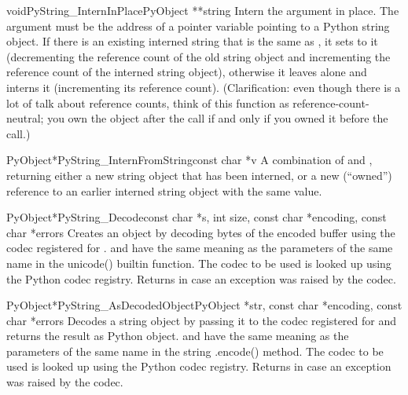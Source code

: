 \documentclass{manual}
\begin{document}
\begin{cfuncdesc}{void}{PyString_InternInPlace}{PyObject **string}
Intern the argument  in place.  The argument must be the
address of a pointer variable pointing to a Python string object.
If there is an existing interned string that is the same as
, it sets  to it (decrementing the reference 
count of the old string object and incrementing the reference count of
the interned string object), otherwise it leaves  alone
and interns it (incrementing its reference count).  (Clarification:
even though there is a lot of talk about reference counts, think of
this function as reference-count-neutral; you own the object after
the call if and only if you owned it before the call.)
\end{cfuncdesc}

\begin{cfuncdesc}{PyObject*}{PyString_InternFromString}{const char *v}
A combination of  and
, returning either a new string object
that has been interned, or a new (``owned'') reference to an earlier
interned string object with the same value.
\end{cfuncdesc}

\begin{cfuncdesc}{PyObject*}{PyString_Decode}{const char *s,
                                               int size,
                                               const char *encoding,
                                               const char *errors}
Creates an object by decoding  bytes of the encoded
buffer  using the codec registered
for .  and  have the same meaning
as the parameters of the same name in the unicode() builtin
function. The codec to be used is looked up using the Python codec
registry. Returns \NULL{} in case an exception was raised by the
codec.
\end{cfuncdesc}

\begin{cfuncdesc}{PyObject*}{PyString_AsDecodedObject}{PyObject *str,
                                               const char *encoding,
                                               const char *errors}
Decodes a string object by passing it to the codec registered
for  and returns the result as Python 
object.  and  have the same meaning as the
parameters of the same name in the string .encode() method. The codec
to be used is looked up using the Python codec registry. Returns
\NULL{} in case an exception was raised by the codec.
\end{cfuncdesc}
\end{document}
